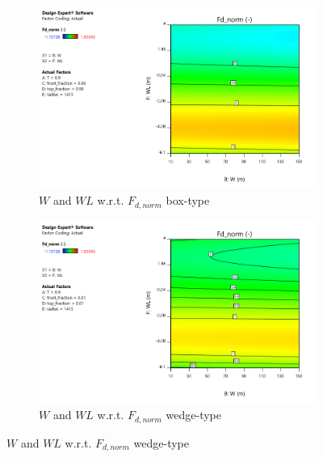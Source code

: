 \begin{figure}[h]
\begin{subfigure}[b]{0.49\textwidth}
        \centering 
        \includegraphics[width=\textwidth]{figures/ComFLOW/Results DI1/Fd_W_WL_box_png.png}
        \caption[]%
        {{\small $W$ and $WL$ w.r.t. $F_{d,norm}$ box-type}}    
        \label{fig: Fd_W_WL_box DI1 H3 captive}
    \end{subfigure}
    \hfill
    \begin{subfigure}[b]{0.49\textwidth}   
        \centering 
        \includegraphics[width=\textwidth]{figures/ComFLOW/Results DI1/Fd_W_WL_wedge_png.png}
        \caption[]%
        {{\small $W$ and $WL$ w.r.t. $F_{d,norm}$ wedge-type}}    
        \label{fig: Fd_W_WL_wedge DI1 H3 captive}
    \end{subfigure}


\end{figure}
